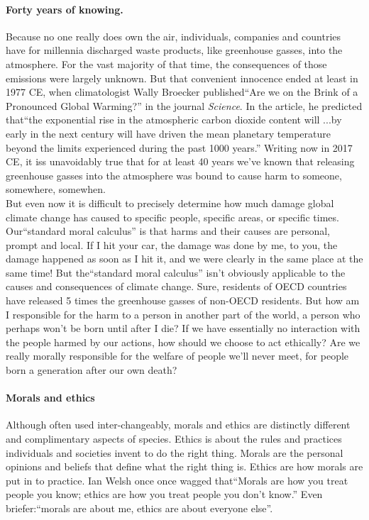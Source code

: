 \documentclass[amstex,12pt]{book}
\begin{document}
\paragraph{Forty years of knowing.} Because no one really does own the air, individuals, companies and countries have for millennia discharged waste products, like greenhouse gasses, into the atmosphere. For the vast majority of that time, the consequences of those emissions were largely unknown. But that convenient innocence ended at least in 1977 CE, when climatologist Wally Broecker published``Are we on the Brink of a Pronounced Global Warming?'' in the journal \textit{Science}. In the article, he predicted that``the exponential rise in the atmospheric carbon dioxide content will ...by early in the next century will have driven the mean planetary temperature beyond the limits experienced during the past 1000 years.'' Writing now in 2017 CE, it iss unavoidably true that for at least 40 years we've known that releasing greenhouse gasses into the atmosphere was bound to cause harm to someone, somewhere, somewhen.\\

But even now it is difficult to precisely determine how much damage global climate change has caused to specific people, specific areas, or specific times. Our``standard moral calculus'' is that harms and their causes are personal, prompt and local. If I hit your car,  the damage was done by me, to you,  the damage happened as soon as I hit it, and we were clearly in the same place at the same time! But the``standard moral calculus'' isn't obviously applicable to the causes and consequences of climate change. Sure, residents of OECD countries have released 5 times the greenhouse gasses of non-OECD residents. But how am I responsible for the harm to a person in another part of the world, a person who perhaps won't be born until after I die? If we have essentially no interaction with the people harmed by our actions, how should we choose to act ethically? Are we really morally responsible for the welfare of people we'll never meet, for people born a generation after our own death?\\

\paragraph{Morals and ethics} Although often used inter-changeably, morals and ethics are distinctly different and complimentary aspects of species. Ethics is about the rules and practices individuals and societies invent to do the right thing. Morals are the personal opinions and beliefs that define what the right thing is. Ethics are how morals are put in to practice. Ian Welsh once once wagged that``Morals are how you treat people you know; ethics are how you treat people you don’t know.'' Even briefer:``morals are about me, ethics are about everyone else''.\\
\end{document}

